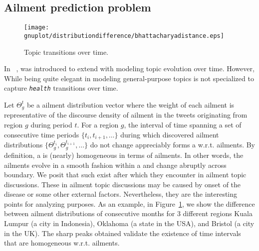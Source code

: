 \subsection{Ailment prediction problem}
\begin{figure}[b!]
\centering
\texttt{[image: gnuplot/distributiondifference/bhattacharyadistance.eps]}
\caption{Topic transitions over time.}
\label{fig:ailmentsEvolve}
\end{figure}
In ~\cite{DBLP:conf/kdd/WangAB12}, \tmlda was introduced to extend \lda with modeling topic evolution over time. However, While being quite elegant in modeling general-purpose topics \tmlda is
not specialized to capture \texttt{\emph{health}} transitions over time.

Let $\Theta_g^t$ be a ailment distribution vector where the weight of each ailment is representative of the discourse density of ailment in the tweets originating from region $g$ during period $t$.
For a region $g$, the interval of time spanning a set of consecutive time periods $\{t_i,t_{i+1},\ldots\}$ during which discovered ailment distributions  $\{\Theta_g^{t_i},\Theta_g^{t_{i+1}},\ldots\}$
do not change appreciably forms a \season w.r.t. ailments. By definition, a \season is (nearly) homogeneous in terms
of ailments. In other words, the ailments evolve in a smooth fashion
within a \season and change abruptly across \season boundary. We posit that such \seasons exist after which they encounter \changes in ailment topic discussions. These \changes in ailment topic discussions 
may be caused by onset of the disease or some other external factors. Nevertheless, they are the interesting points for analyzing purposes.
As an example, in Figure~\ref{fig:ailmentsEvolve}, we show the difference between ailment distributions of consecutive months for 3 different regions Kuala Lumpur (a city in Indonesia), Oklahoma (a state in the USA), and Bristol (a city in the UK). The sharp peaks obtained validate the existence of time intervals that are homogeneous w.r.t. ailments.
